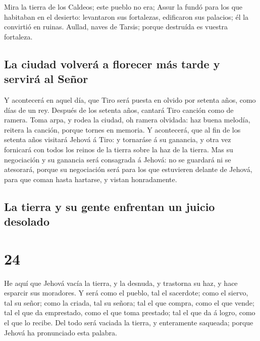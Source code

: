  Mira la tierra de los Caldeos; este pueblo no era; Assur
la fundó para los que habitaban en el desierto: levantaron sus
fortalezas, edificaron sus palacios; él la convirtió en ruinas.
 Aullad, naves de Tarsis; porque destruída es vuestra
fortaleza.

\hypertarget{la-ciudad-volveruxe1-a-florecer-muxe1s-tarde-y-serviruxe1-al-seuxf1or}{%
\subsection{La ciudad volverá a florecer más tarde y servirá al
Señor}\label{la-ciudad-volveruxe1-a-florecer-muxe1s-tarde-y-serviruxe1-al-seuxf1or}}

 Y acontecerá en aquel día, que Tiro será puesta en
olvido por setenta años, como días de un rey. Después de los setenta
años, cantará Tiro canción como de ramera.  Toma arpa, y
rodea la ciudad, oh ramera olvidada: haz buena melodía, reitera la
canción, porque tornes en memoria.  Y acontecerá, que al
fin de los setenta años visitará Jehová á Tiro: y tornaráse á su
ganancia, y otra vez fornicará con todos los reinos de la tierra sobre
la haz de la tierra.  Mas su negociación y su ganancia
será consagrada á Jehová: no se guardará ni se atesorará, porque su
negociación será para los que estuvieren delante de Jehová, para que
coman hasta hartarse, y vistan honradamente.

\hypertarget{la-tierra-y-su-gente-enfrentan-un-juicio-desolado}{%
\subsection{La tierra y su gente enfrentan un juicio
desolado}\label{la-tierra-y-su-gente-enfrentan-un-juicio-desolado}}

\hypertarget{section-23-24}{%
\section{24}\label{section-23-24}}

 He aquí que Jehová vacía la tierra, y la desnuda, y
trastorna su haz, y hace esparcir sus moradores.  Y será
como el pueblo, tal el sacerdote; como el siervo, tal su señor; como la
criada, tal su señora; tal el que compra, como el que vende; tal el que
da emprestado, como el que toma prestado; tal el que da á logro, como el
que lo recibe.  Del todo será vaciada la tierra, y
enteramente saqueada; porque Jehová ha pronunciado esta palabra.

